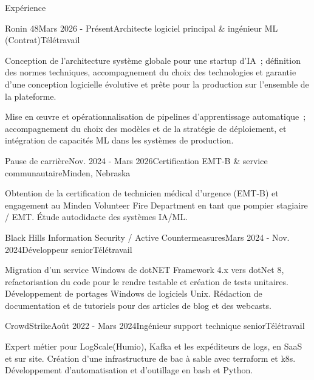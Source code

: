\documentclass{resume} %
\begin{document}

\begin{rSection}{Exp\'erience}

\begin{rSubsection}{Ronin 48}{Mars 2026 - Pr\'esent}{Architecte logiciel principal \& ing\'enieur ML (Contrat)}{T\'el\'etravail}
	\item Conception de l'architecture syst\`eme globale pour une startup d'IA~; d\'efinition des normes techniques, accompagnement du choix des technologies et garantie d'une conception logicielle \'evolutive et pr\^ete pour la production sur l'ensemble de la plateforme.
	\item Mise en \oe{}uvre et op\'erationnalisation de pipelines d'apprentissage automatique~; accompagnement du choix des mod\`eles et de la strat\'egie de d\'eploiement, et int\'egration de capacit\'es ML dans les syst\`emes de production.
\end{rSubsection}

\begin{rSubsection}{Pause de carri\`ere}{Nov. 2024 - Mars 2026}{Certification EMT-B \& service communautaire}{Minden, Nebraska}
	\item Obtention de la certification de technicien m\'edical d'urgence (EMT-B) et engagement au Minden Volunteer Fire Department en tant que pompier stagiaire / EMT. \'Etude autodidacte des syst\`emes IA/ML.
\end{rSubsection}

\begin{rSubsection}{Black Hills Information Security / Active Countermeasures}{Mars 2024 - Nov. 2024}{D\'eveloppeur senior}{T\'el\'etravail}
	\item Migration d'un service Windows de dotNET Framework 4.x vers dotNet 8, refactorisation du code pour le rendre testable et cr\'eation de tests unitaires. D\'eveloppement de portages Windows de logiciels Unix. R\'edaction de documentation et de tutoriels pour des articles de blog et des webcasts.
\end{rSubsection}

\begin{rSubsection}{CrowdStrike}{Ao\^ut 2022 - Mars 2024}{Ing\'enieur support technique senior}{T\'el\'etravail}
	\item Expert m\'etier pour LogScale(Humio), Kafka et les exp\'editeurs de logs, en SaaS et sur site. Cr\'eation d'une infrastructure de bac \`a sable avec terraform et k8s. D\'eveloppement d'automatisation et d'outillage en bash et Python.
\end{rSubsection}


\end{rSection}
\end{document}

